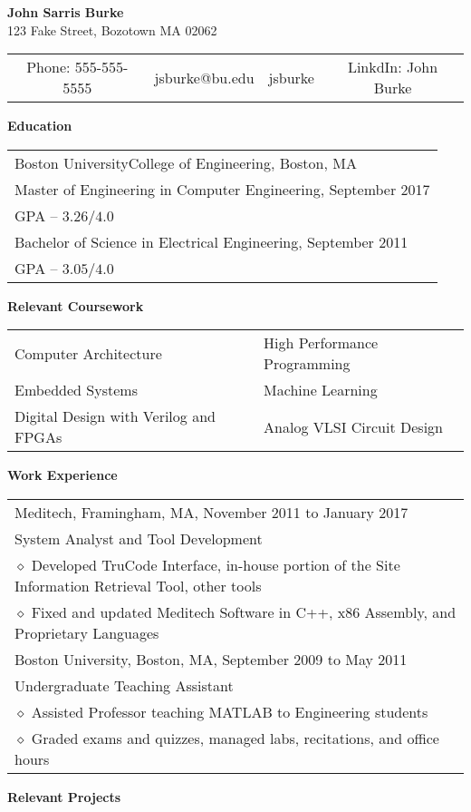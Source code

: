\documentclass[11pt,letterpaper]{article}
\makeatletter
\newcommand{\pseudoitem}{\diamond}
\newcommand{\vertspace}{\vspace{2mm}}
\newcommand{\horzindent}{\hspace{3mm}}
\newcommand{\minoritem}{\hspace{4.5mm} $\pseudoitem$ }
\newcommand{\name}{John Sarris Burke}
\newcommand{\address}{123 Fake Street, Bozotown MA 02062}
\newcommand{\phone}{555-555-5555}
\newcommand{\email}{jsburke@bu.edu}
\newcommand{\github}{jsburke}
\newcommand{\linkdin}{John Burke}
\newcommand{\undergrad}{Boston University}
\newcommand{\undergradmajor}{Electrical Engineering}
\newcommand{\undergradend}{September 2011}
\newcommand{\grad}{Boston University}
\newcommand{\gradschool}{College of Engineering}
\newcommand{\gradmajor}{Computer Engineering}
\newcommand{\gradend}{September 2017}
\newlength\myheight
\newlength\mydepth
\newcommand*\inlineicon[1]{%
  \settototalheight\myheight{Xygp}%
  \settodepth\mydepth{Xygp}%
  \raisebox{-\mydepth}{\texttt{[image: \#1]}}%
}
\newcommand{\iconemail}{\inlineicon{email-icon-2048}\space}
\newcommand{\icongithub}{\inlineicon{GitHub-Mark-120px-plus}\space}
\newcommand{\iconphone}{Phone: }
\newcommand{\iconlinkdin}{LinkdIn: }
\makeatother
\begin{document}
	
	\begin{center}	
		\textbf{\large \name}\\
		\address\\
		\begin{tabular}{c||c||c||c}
			\iconphone \phone & \iconemail \email & \icongithub \github & \iconlinkdin \linkdin \\
		\end{tabular}
	\end{center}

	\noindent
	\textbf{Education} \\
		\begin{tabular}{l}
			\grad\space\gradschool , Boston, MA \\
			Master of Engineering in \gradmajor , \gradend \\
			GPA -- $3.26 / 4.0$ \\
			Bachelor of Science in \undergradmajor , \undergradend \\
			GPA -- $3.05 / 4.0$ \\
		\end{tabular}
	
	\vertspace
	\noindent	
	\textbf{Relevant Coursework}	 \\
		\begin{tabular}{ll}
			Computer Architecture & High Performance Programming \\
			Embedded Systems      & Machine Learning \\
			Digital Design with Verilog and FPGAs & Analog VLSI Circuit Design \\
		\end{tabular}
		
	\vertspace
	\noindent
	\textbf{Work Experience} \\
		\begin{tabular}{l}
			Meditech, Framingham, MA, November 2011 to January 2017\\
			\horzindent System Analyst and Tool Development \\
			\minoritem Developed TruCode Interface, in-house portion of the Site Information Retrieval Tool, other tools \\
			\minoritem Fixed and updated Meditech Software in C++, x86 Assembly, and Proprietary Languages \\
			\undergrad , Boston, MA, September 2009 to May 2011 \\
			\horzindent Undergraduate Teaching Assistant \\
			\minoritem Assisted Professor teaching MATLAB to Engineering students \\
			\minoritem Graded exams and quizzes, managed labs, recitations, and office hours \\
		\end{tabular}
		
	\vertspace
	\noindent
	\textbf{Relevant Projects}
\end{document}

